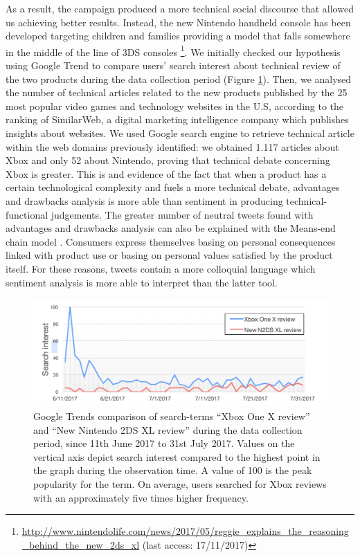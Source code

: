 \documentclass[]{book}
\let\rmarkdownfootnote\footnote%
\def\footnote{\protect\rmarkdownfootnote}
\begin{document}
As a result, the campaign produced a more technical social discourse
that allowed us achieving better results. Instead, the new Nintendo
handheld console has been developed targeting children and families
providing a model that falls somewhere in the middle of the line of 3DS
consoles \footnote{\url{http://www.nintendolife.com/news/2017/05/reggie_explains_the_reasoning_behind_the_new_2ds_xl}
  (last access: 17/11/2017)}. We initially checked our hypothesis using
Google Trend to compare users' search interest about technical review of
the two products during the data collection period (Figure
\ref{fig:tweetsearchinterest}). Then, we analysed the number of
technical articles related to the new products published by the 25 most
popular video games and technology websites in the U.S, according to the
ranking of SimilarWeb, a digital marketing intelligence company which
publishes insights about websites. We used Google search engine to
retrieve technical article within the web domains previously identified:
we obtained 1.117 articles about Xbox and only 52 about Nintendo,
proving that technical debate concerning Xbox is greater. This is and
evidence of the fact that when a product has a certain technological
complexity and fuels a more technical debate, advantages and drawbacks
analysis is more able than sentiment in producing technical-functional
judgements. The greater number of neutral tweets found with advantages
and drawbacks analysis can also be explained with the Means-end chain
model \citep{reynolds1995means}. Consumers express themselves basing on
personal consequences linked with product use or basing on personal
values satisfied by the product itself. For these reasons, tweets
contain a more colloquial language which sentiment analysis is more able
to interpret than the latter tool.

\begin{figure}

{\centering \includegraphics[width=1\linewidth]{_bookdown_files/figures/tweet_search_interest} 

}

\caption{Google Trends comparison of search-terms “Xbox One X review” and “New Nintendo 2DS XL review” during the data collection period, since 11th June 2017 to 31st July 2017. Values on the vertical axis depict search interest compared to the highest point in the graph during the observation time. A value of 100 is the peak popularity for the term. On average, users searched for Xbox reviews with an approximately five times higher frequency.}\label{fig:tweetsearchinterest}
\end{figure}
\end{document}
